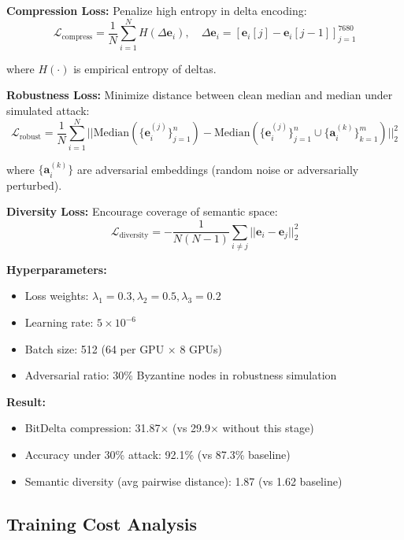 \textbf{Compression Loss:} Penalize high entropy in delta encoding:
\begin{equation}
\mathcal{L}_{\text{compress}} = \frac{1}{N} \sum_{i=1}^{N} H(\Delta \mathbf{e}_i), \quad \Delta \mathbf{e}_i = [\mathbf{e}_i[j] - \mathbf{e}_i[j-1]]_{j=1}^{7680}
\end{equation}

where $H(\cdot)$ is empirical entropy of deltas.

\textbf{Robustness Loss:} Minimize distance between clean median and median under simulated attack:
\begin{equation}
\mathcal{L}_{\text{robust}} = \frac{1}{N} \sum_{i=1}^{N} ||\text{Median}(\{\mathbf{e}_i^{(j)}\}_{j=1}^{n}) - \text{Median}(\{\mathbf{e}_i^{(j)}\}_{j=1}^{n} \cup \{\mathbf{a}_i^{(k)}\}_{k=1}^{m})||_2^2
\end{equation}

where $\{\mathbf{a}_i^{(k)}\}$ are adversarial embeddings (random noise or adversarially perturbed).

\textbf{Diversity Loss:} Encourage coverage of semantic space:
\begin{equation}
\mathcal{L}_{\text{diversity}} = -\frac{1}{N(N-1)} \sum_{i \neq j} ||\mathbf{e}_i - \mathbf{e}_j||_2^2
\end{equation}

\textbf{Hyperparameters:}
\begin{itemize}
\item Loss weights: $\lambda_1=0.3, \lambda_2=0.5, \lambda_3=0.2$
\item Learning rate: $5 \times 10^{-6}$
\item Batch size: 512 (64 per GPU $\times$ 8 GPUs)
\item Adversarial ratio: 30\% Byzantine nodes in robustness simulation
\end{itemize}

\textbf{Result:}
\begin{itemize}
\item BitDelta compression: 31.87$\times$ (vs 29.9$\times$ without this stage)
\item Accuracy under 30\% attack: 92.1\% (vs 87.3\% baseline)
\item Semantic diversity (avg pairwise distance): 1.87 (vs 1.62 baseline)
\end{itemize}

\subsection{Training Cost Analysis}

